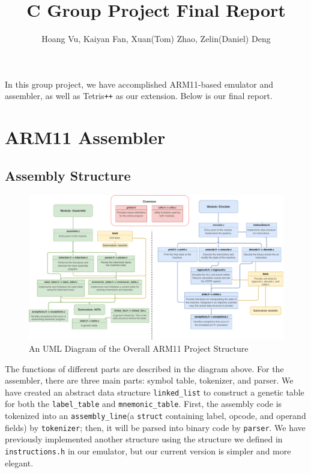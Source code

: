 \documentclass[11pt]{article}
\begin{document}
\title{C Group Project Final Report}
\author{Hoang Vu, Kaiyan Fan, Xuan(Tom) Zhao, Zelin(Daniel) Deng}

\maketitle

\noindent In this group project, we have accomplished ARM11-based emulator and assembler, as well as Tetris\texttt{++} as our extension. Below is our final report.


\section{ARM11 Assembler}

\subsection{Assembly Structure}
\begin{figure}[!ht]
  \centering
  \includegraphics[scale = 0.5]{project_structure_final.pdf}
  \caption{An UML Diagram of the Overall ARM11 Project Structure}
  \label{part1:UML}
\end{figure}
\begin{flushleft}
The functions of different parts are described in the diagram above. For the assembler, there are three main parts: symbol table, tokenizer, and parser. We have created an abstract data structure \texttt{linked\_list} to construct a genetic table for both the \texttt{label\_table} and \texttt{mnemonic\_table}. First, the assembly code is tokenized into an \texttt{assembly\_line}(a \texttt{struct} containing label, opcode, and operand fields) by \texttt{tokenizer}; then, it will be parsed into binary code by \texttt{parser}. We have previously implemented another structure using the structure we defined in \texttt{instructions.h} in our emulator, but our current version is simpler and more elegant.
\end{flushleft}
\end{document}

